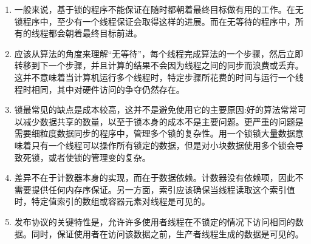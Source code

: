 \begin{enumerate}
\item 
一般来说，基于锁的程序不能保证在随时都朝着最终目标做有用的工作。在无锁程序中，至少有一个线程保证会取得这样的进展。而在无等待的程序中，所有的线程都会朝着最终目标前进。

\item 
应该从算法的角度来理解“无等待”，每个线程完成算法的一个步骤，然后立即转移到下一个步骤，并且计算的结果不会因为线程之间的同步而浪费或丢弃。这并不意味着当计算机运行多个线程时，特定步骤所花费的时间与运行一个线程时相同，其中对硬件访问的争夺仍然存在。

\item 
锁最常见的缺点是成本较高，这并不是避免使用它的主要原因:好的算法常常可以减少数据共享的数量，以至于锁本身的成本不是主要问题。更严重的问题是需要细粒度数据同步的程序中，管理多个锁的复杂性。用一个锁锁大量数据意味着只有一个线程可以操作所有锁定的数据，但是对小块数据使用多个锁会导致死锁，或者使锁的管理变的复杂。

\item
差异不在于计数器本身的实现，而在于数据依赖。计数器没有依赖项，因此不需要提供任何内存序保证。另一方面，索引应该确保当线程读取这个索引值时，特定值索引的数组或容器元素对线程是可见的。

\item
发布协议的关键特性是，允许许多使用者线程在不锁定的情况下访问相同的数据。同时，保证使用者在访问该数据之前，生产者线程生成的数据是可见的。

\end{enumerate}
